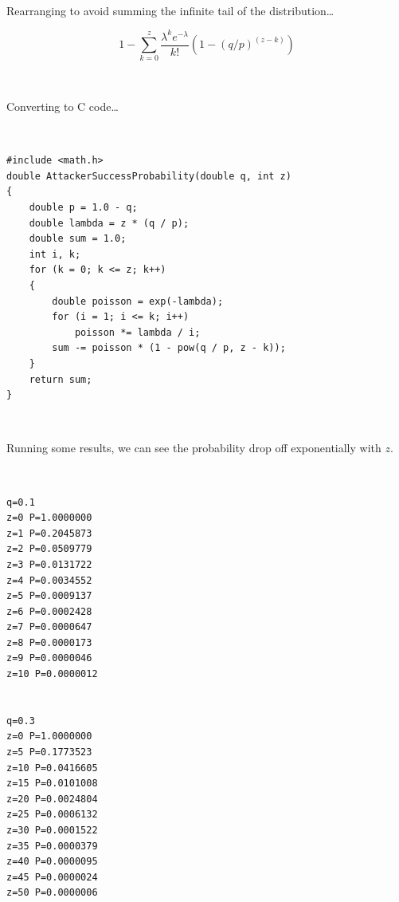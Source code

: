 \documentclass[nohyper]{tufte-handout}
\begin{document}
\

Rearranging to avoid summing the infinite tail of the
distribution\ldots{}

 
\begin{equation}
1 - \sum _{k=0}^z \frac{\lambda ^k e^{-\lambda}}{k!} \left(1 - \left(q/p\right)^{(z-k)}\right)
\end{equation}

\

Converting to C code\ldots{}

\


\begin{lstlisting}
#include <math.h>
double AttackerSuccessProbability(double q, int z)
{
    double p = 1.0 - q;
    double lambda = z * (q / p);
    double sum = 1.0;
    int i, k;
    for (k = 0; k <= z; k++)
    {
        double poisson = exp(-lambda);
        for (i = 1; i <= k; i++)
            poisson *= lambda / i;
        sum -= poisson * (1 - pow(q / p, z - k));
    }
    return sum;
}
\end{lstlisting}

\

Running some results, we can see the probability drop off exponentially
with $z$.

\

\begin{verbatim}
q=0.1
z=0 P=1.0000000
z=1 P=0.2045873
z=2 P=0.0509779
z=3 P=0.0131722
z=4 P=0.0034552
z=5 P=0.0009137
z=6 P=0.0002428
z=7 P=0.0000647
z=8 P=0.0000173
z=9 P=0.0000046
z=10 P=0.0000012


q=0.3
z=0 P=1.0000000
z=5 P=0.1773523
z=10 P=0.0416605
z=15 P=0.0101008
z=20 P=0.0024804
z=25 P=0.0006132
z=30 P=0.0001522
z=35 P=0.0000379
z=40 P=0.0000095
z=45 P=0.0000024
z=50 P=0.0000006
\end{verbatim}
\end{document}
